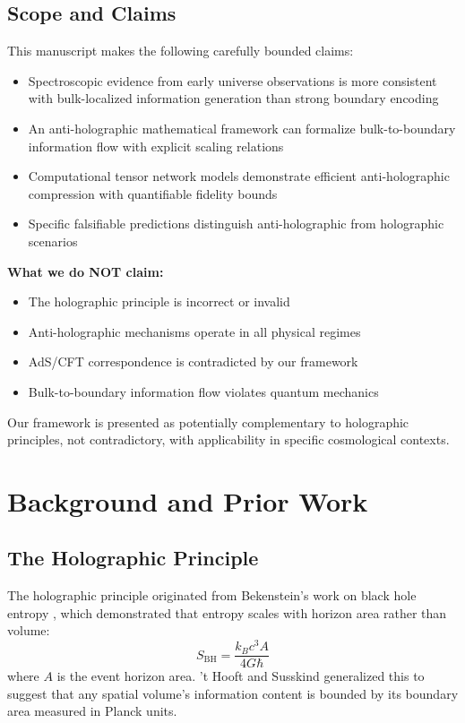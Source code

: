 \documentclass[twocolumn,aps,prd,superscriptaddress,nofootinbib]{revtex4-2}
\begin{document}
\subsection{Scope and Claims}

This manuscript makes the following carefully bounded claims:

\begin{itemize}
    \item Spectroscopic evidence from early universe observations is more consistent with bulk-localized information generation than strong boundary encoding
    \item An anti-holographic mathematical framework can formalize bulk-to-boundary information flow with explicit scaling relations
    \item Computational tensor network models demonstrate efficient anti-holographic compression with quantifiable fidelity bounds
    \item Specific falsifiable predictions distinguish anti-holographic from holographic scenarios
\end{itemize}

\textbf{What we do NOT claim:}
\begin{itemize}
    \item The holographic principle is incorrect or invalid
    \item Anti-holographic mechanisms operate in all physical regimes
    \item AdS/CFT correspondence is contradicted by our framework
    \item Bulk-to-boundary information flow violates quantum mechanics
\end{itemize}

Our framework is presented as potentially complementary to holographic principles, not contradictory, with applicability in specific cosmological contexts.

\section{Background and Prior Work}

\subsection{The Holographic Principle}

The holographic principle originated from Bekenstein's work on black hole entropy \cite{Bekenstein1973}, which demonstrated that entropy scales with horizon area rather than volume:
\begin{equation}
S_{\text{BH}} = \frac{k_B c^3 A}{4 G \hbar}
\end{equation}
where $A$ is the event horizon area. 't Hooft \cite{tHooft1993} and Susskind \cite{Susskind1995} generalized this to suggest that any spatial volume's information content is bounded by its boundary area measured in Planck units.
\end{document}
